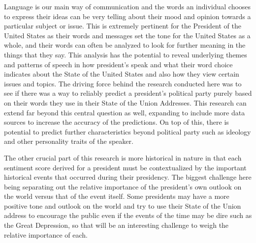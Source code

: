 Language is our main way of communication and the words an individual chooses to express their ideas can be very telling about their mood and opinion towards a particular subject or issue.
This is extremely pertinent for the President of the United States as their words and messages set the tone for the United States as a whole, and their words can often be analyzed to look for further meaning in the things that they say.
This analysis has the potential to reveal underlying themes and patterns of speech in how president's speak and what their word choice indicates about the State of the United States and also how they view certain issues and topics.
The driving force behind the research conducted here was to see if there was a way to reliably predict a president's political party purely based on their words they use in their State of the Union Addresses.
This research can extend far beyond this central question as well, expanding to include more data sources to increase the accuracy of the predictions.
On top of this, there is potential to predict further characteristics beyond political party such as ideology and other personality traits of the speaker.

The other crucial part of this research is more historical in nature in that each sentiment score derived for a president must be contextualized by the important historical events that occurred during their presidency.
The biggest challenge here being separating out the relative importance of the president's own outlook on the world versus that of the event itself.
Some presidents may have a more positive tone and outlook on the world and try to use their State of the Union address to encourage the public even if the events of the time may be dire such as the Great Depression, so that will be an interesting challenge to weigh the relative importance of each.